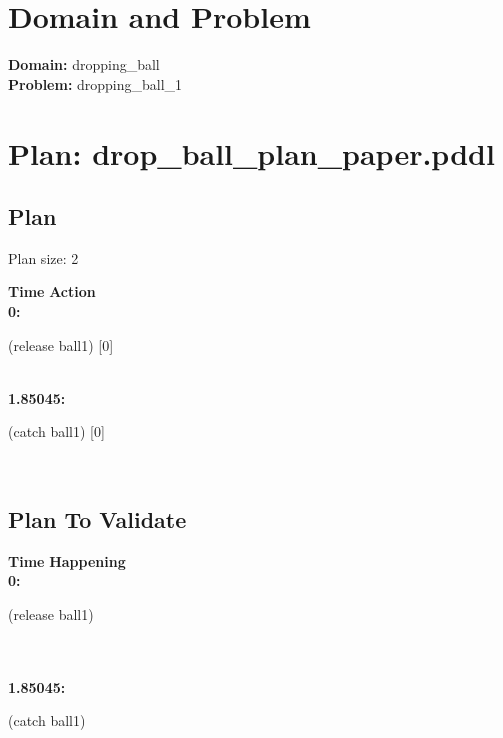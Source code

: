 \documentclass[a4paper,12pt]{article}
\author{\mbox{\sc {\sc Val}}}
\newcommand{\headingtimeaction}{{\bf Time} \qquad \= {\bf Action}\\[0.8ex]}
\newcommand{\headingtimehappening}{{\bf Time} \qquad \= {\bf Happening}\\[0.8ex]}
\newcommand{\atime}[1]{{\bf #1:}}
\newcommand{\action}[1]{{\sf #1}}
\newcommand{\listrow}[1]{\begin{minipage}[t]{11.5cm} #1 \end{minipage}}
\begin{document}
 \maketitle 
\section{Domain and Problem}
{\bf Domain:} dropping\_ball\\
{\bf Problem:} dropping\_ball\_1
\section{\sloppy Plan: drop\_ball\_plan\_paper.pddl}
\subsection{Plan}
Plan size: 2
\begin{tabbing}
\headingtimeaction 
\atime{0} \> \listrow{\action{(release ball1) [0]}}\\
\atime{1.85045} \> \listrow{\action{(catch ball1) [0]}}\\
\end{tabbing}
\subsection{Plan To Validate}
\begin{tabbing}
\headingtimehappening 
\atime{0}  \> \listrow{\action{(release ball1)}}\\
\\\atime{1.85045}  \> \listrow{\action{(catch ball1)}}\\
\end{tabbing}
\end{document}
